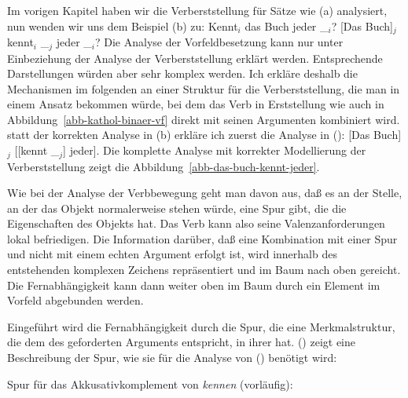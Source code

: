 Im vorigen Kapitel haben wir die Verberststellung für Sätze wie (a) analysiert, nun wenden wir uns
dem Beispiel (b) zu:
\eal
\ex Kennt$_i$ das Buch jeder \_$_i$?
\ex {}[Das Buch]$_j$ kennt$_i$ \_$_j$ jeder \_$_i$?
\zl
Die Analyse der Vorfeldbesetzung kann nur unter Einbeziehung der Analyse der Verberststellung erklärt
werden. Entsprechende Darstellungen würden aber sehr komplex werden. Ich erkläre deshalb
die Mechanismen im folgenden an einer Struktur für die Verberststellung, die man in einem
Ansatz %
bekommen würde, bei dem das Verb in Erststellung wie auch in Abbildung~\ref{abb-kathol-binaer-vf}
direkt mit seinen Argumenten kombiniert wird. \Dh statt der korrekten Analyse in (b) erkläre
ich zuerst die Analyse in ():
\ea
{}[Das Buch]$_j$ [[kennt \_$_j$] jeder].\label{ex-das-buch-kennt}
\z 
Die komplette Analyse mit korrekter Modellierung der Verberststellung zeigt
die Abbildung~\vref{abb-das-buch-kennt-jeder}.


Wie bei der Analyse der Verbbewegung geht man davon aus, daß es an der Stelle, an der
das Objekt normalerweise stehen würde, eine Spur gibt, die die Eigenschaften des Objekts
hat. Das Verb kann also seine Valenzanforderungen lokal befriedigen. Die Information darüber,
daß eine Kombination mit einer Spur und nicht mit einem echten Argument erfolgt ist,
wird innerhalb des entstehenden komplexen Zeichens repräsentiert und im Baum nach oben gereicht.
Die Fernabhängigkeit kann dann weiter oben im Baum durch ein Element im Vorfeld abgebunden werden.

Eingeführt wird die Fernabhängigkeit durch die Spur, die eine
Merkmalstruktur, die dem \localw des geforderten Arguments entspricht, in ihrer
\slashl hat. () zeigt eine Beschreibung der Spur, wie sie für die Analyse von () benötigt wird:

\eas
\label{le-spur-acc-o-kennen}
Spur für das Akkusativkomplement von \emph{kennen} (vorläufig):\\
\zs

